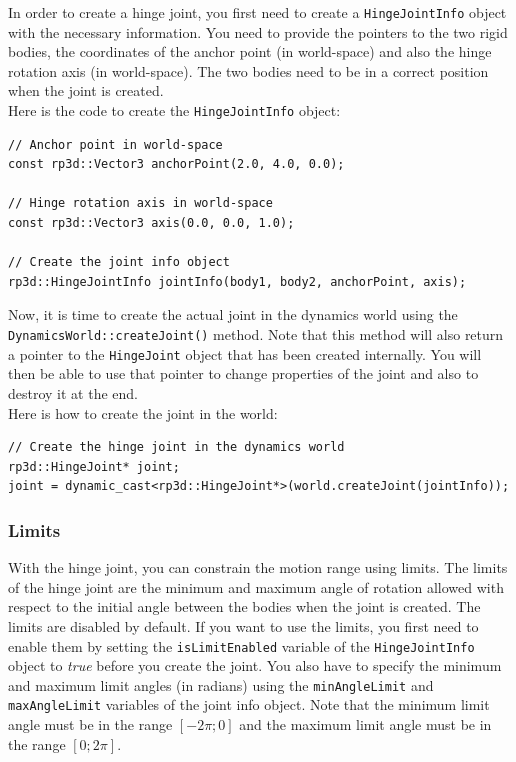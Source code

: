 \documentclass[a4paper,12pt]{article}
\begin{document}
    In order to create a hinge joint, you first need to create a \texttt{HingeJointInfo} object with the necessary information. You need to provide the pointers to the
    two rigid bodies, the coordinates of the anchor point (in world-space) and also the hinge rotation axis (in world-space). The two bodies need to be in a correct position
    when the joint is created. \\

    Here is the code to create the \texttt{HingeJointInfo} object: \\

    \begin{lstlisting}
// Anchor point in world-space
const rp3d::Vector3 anchorPoint(2.0, 4.0, 0.0);

// Hinge rotation axis in world-space
const rp3d::Vector3 axis(0.0, 0.0, 1.0);

// Create the joint info object
rp3d::HingeJointInfo jointInfo(body1, body2, anchorPoint, axis);
  \end{lstlisting}

    \vspace{0.6cm}

    Now, it is time to create the actual joint in the dynamics world using the \texttt{DynamicsWorld::createJoint()} method.
    Note that this method will also return a pointer to the \texttt{HingeJoint} object that has been created internally. You will then
    be able to use that pointer to change properties of the joint and also to destroy it at the end. \\

    Here is how to create the joint in the world: \\

    \begin{lstlisting}
// Create the hinge joint in the dynamics world
rp3d::HingeJoint* joint;
joint = dynamic_cast<rp3d::HingeJoint*>(world.createJoint(jointInfo));
  \end{lstlisting}

     \subsubsection{Limits}

     With the hinge joint, you can constrain the motion range using limits. The limits of the hinge joint are the minimum and maximum angle of rotation allowed with respect to the initial
     angle between the bodies when the joint is created. The limits are disabled by default. If you want to use the limits, you first need to enable them by setting the
     \texttt{isLimitEnabled} variable of the \texttt{HingeJointInfo} object to \emph{true} before you create the joint. You also have to specify the minimum and maximum limit
     angles (in radians) using the \texttt{minAngleLimit} and \texttt{maxAngleLimit} variables of the joint info object. Note that the minimum limit angle must be in the
     range $[ -2 \pi; 0 ]$ and the maximum limit angle must be in the range $[ 0; 2 \pi ]$. \\
\end{document}
